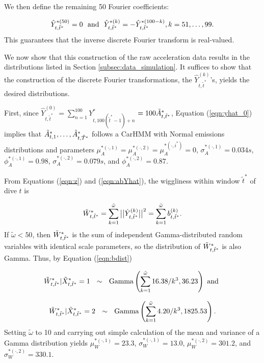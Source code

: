    We then define the remaining 50 Fourier coefficients:
   
    \[
        \hat{Y}^{*(50)}_{t,\tilde t^*} = 0 {\rm{~~and ~~}}
	    \hat{Y}^{*(k)}_{t,\tilde t^*} = -\hat{Y}^{*(100-k)}_{t,\tilde t^*} , k = 51,\ldots,99.
    \]
   This guarantees that the inverse discrete Fourier transform is real-valued. 
  

We now show that this construction of the raw acceleration data results in the distributions listed in Section \ref{subsec:data_simulation}. It suffices to show that the construction of the discrete Fourier transformations, the $\hat{Y}^{(k)}_{t,\tilde t^*}$'s, yields the desired distributions.

First, since $\hat{Y}^{(0)}_{t,\tilde t^*} = \sum_{n=1}^{100} Y^*_{t,100(\tilde t^* - 1) + n} $ $=100\tilde{A}^*_{t,\tilde{t}^*}$, Equation (\ref{eqn:yhat_0}) implies that 
$\tilde{A}^*_{t,1}, \ldots, \tilde{A}^*_{t,\tilde{T}^*}$ 
follows a CarHMM with Normal emissions distributions and parameters 
 $\mu_A^{*(\cdot,1)} = \mu_A^{*(\cdot,2)} = \mu_A^{*(\cdot,i^*)} = 0$,  $\sigma_A^{*(\cdot,1)} = 0.034s$, $\phi_A^{*(\cdot,1)} = 0.98$, $\sigma_A^{*(\cdot,2)} = 0.079s$, and $\phi_A^{*(\cdot,2)} = 0.87$.

From Equations (\ref{eqn:z}) and (\ref{eqn:abYhat}), 
the wiggliness within window $\tilde t^*$ of dive $t$ is 

\[
    \tilde{W}^*_{t,\tilde t^*} = \sum_{k=1}^{\tilde \omega} \big|\big|\hat{Y}^{(k)}_{t,\tilde t^*}\big|\big|^2 =  \sum_{k=1}^{\tilde \omega} b^{(k)}_{t,\tilde t^*}.
\]
%
If $\tilde \omega < 50$, then $\tilde{W}^*_{t,\tilde t^*}$ is the sum of independent Gamma-distributed random variables with identical scale parameters, so the distribution of $\tilde{W}^*_{t,\tilde t^*}$ is also Gamma. Thus, by Equation (\ref{eqn:bdist})

\[
    \tilde{W}^*_{t,\tilde t^*}|\tilde X^*_{t,\tilde t^*} = 1  ~~ \sim ~~ {\rm{Gamma}}\left(\sum_{k=1}^{\tilde \omega} 16.38/k^3 , 36.23 \right) 
    \text { and }
\]

\[
\tilde{W}^*_{t,\tilde t^*}|\tilde X^*_{t,\tilde t^*} = 2 ~~\sim~~ {\rm{Gamma}}\left(\sum_{k=1}^{\tilde \omega} 4.20/k^3 , 1825.53 \right).
\]
Setting $\tilde \omega$ to 10 and carrying out simple calculation of the mean and variance of a Gamma distribution yields $\mu_W^{*(\cdot,1)} = 23.3$, $\sigma_W^{*(\cdot,1)} = 13.0$, $\mu_W^{*(\cdot,2)} = 301.2$, and $\sigma_W^{*(\cdot,2)} = 330.1$.



